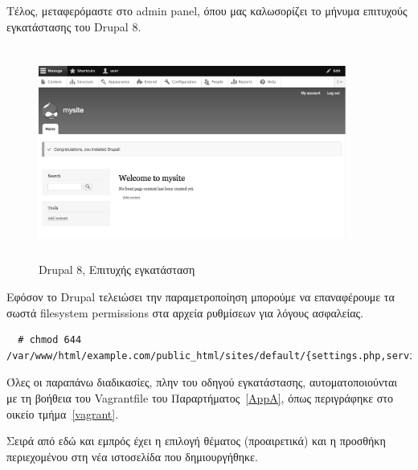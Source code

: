 \documentclass[12pt]{report}
\begin{document}
Τέλος, μεταφερόμαστε στο \textlatin{admin panel}, όπου μας καλωσορίζει το μήνυμα επιτυχούς εγκατάστασης του \textlatin{Drupal 8}.
\begin{figure}[H]
\centering
\includegraphics[width=0.9\textwidth, height=7cm]{drupal-gray}
\caption{\textlatin{Drupal 8}, Επιτυχής εγκατάσταση}
\label{fig:drupal_success}
\end{figure}

Εφόσον το \textlatin{Drupal} τελειώσει την παραμετροποίηση μπορούμε να επαναφέρουμε τα σωστά \textlatin{filesystem permissions} στα αρχεία ρυθμίσεων για λόγους ασφαλείας.
\scriptsize
\begin{verbatim}
  # chmod 644 /var/www/html/example.com/public_html/sites/default/{settings.php,services.yml}
\end{verbatim}
\normalsize
{}

Όλες οι παραπάνω διαδικασίες, πλην του οδηγού εγκατάστασης, αυτοματοποιούνται με τη βοήθεια του \textlatin{Vagrantfile} του Παραρτήματος~\ref{AppA}, όπως περιγράφηκε στο οικείο τμήμα~\ref{vagrant}.

Σειρά από εδώ και εμπρός έχει η επιλογή θέματος (προαιρετικά) και η προσθήκη περιεχομένου στη νέα ιστοσελίδα που δημιουργήθηκε.
\end{document}
